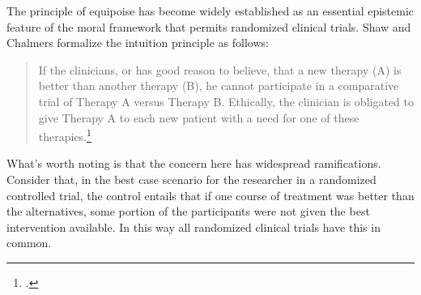 \documentclass[letterpaper,notitlepage,12pt]{article}
\begin{document}
The principle of equipoise has become widely established as an essential
epistemic feature of the moral framework that permits randomized clinical
trials.
Shaw and Chalmers formalize the intuition principle as follows:
\blockquote{If the clinicians, or has good reason to believe, that a new
  therapy (A) is better than another therapy (B), he cannot participate in a
  comparative trial of Therapy A versus Therapy B. Ethically, the clinician is
  obligated to give Therapy A to each new patient with a need for one of these
therapies.\footcite[p. 487]{shaw_ethics_1970}}
What's worth noting is that the concern here has widespread ramifications.
Consider that, in the best case scenario for the researcher in a randomized
controlled trial, the control entails that if one course of treatment was better
than the alternatives, some portion of the participants were not given the best
intervention available.
In this way all randomized clinical trials have this in common.
\end{document}
